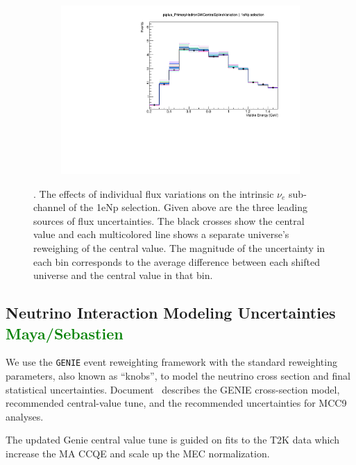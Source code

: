 \documentclass[a4paper]{article}
\begin{document}
\begin{figure}[ht]
\begin{center}
\begin{subfigure}[b]{0.33\textwidth}
    \end{subfigure}
    \begin{subfigure}[b]{0.33\textwidth}
    \centering
    \includegraphics[width=1.00\textwidth]{systvariations/Variation_nue_reco_e_genietune_run1_fluxonly_piplus_PrimaryHadronSWCentralSplineVariation_nu_uBooNE_nue_intrinsic.pdf}
    \end{subfigure}
\caption{\label{fig:fluxsystvars}. The effects of individual flux variations on the intrinsic $\nu_e$ sub-channel of the 1eNp selection. Given above are the three leading sources of flux uncertainties. The black crosses show the central value and each multicolored line shows a separate universe's reweighing of the central value. The magnitude of the  uncertainty in each bin corresponds to the average difference between each shifted universe and the central value in that bin.}
\end{center}
\end{figure}

\subsection{Neutrino Interaction Modeling Uncertainties \textcolor{green}{Maya/Sebastien}}
We use the \texttt{GENIE} event reweighting framework with the standard reweighting parameters, also known as ``knobs'', to model the neutrino cross section and final statistical uncertainties. Document~\cite{bib:geniesupportnote} describes the GENIE cross-section model, recommended central-value tune, and the recommended uncertainties for MCC9 analyses. 

The updated Genie central value tune is guided on fits to the T2K data which increase the MA CCQE and scale up the MEC normalization.
\end{document}
